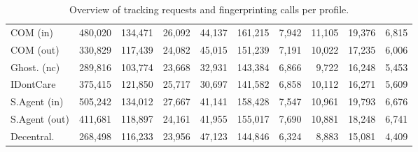 \begin{table}[H]
\begin{tabular}{lrrrrrrrrr}
    COM (in) & 480,020 & 134,471 & 26,092 & 44,137 & 161,215 & 7,942 & 11,105 & 19,376 & 6,815 \\
    COM (out) & 330,829 & 117,439 & 24,082 & 45,015 & 151,239 & 7,191 & 10,022 & 17,235 & 6,006 \\
    Ghost. (nc) & 289,816 & 103,774 & 23,668 & 32,931 & 143,384 & 6,866 & 9,722 & 16,248 & 5,453 \\
    IDontCare & 375,415 & 121,850 & 25,717 & 30,697 & 141,582 & 6,858 & 10,112 & 16,271 & 5,609 \\
    S.Agent (in) & 505,242 & 134,012 & 27,667 & 41,141 & 158,428 & 7,547 & 10,961 & 19,793 & 6,676 \\
    S.Agent (out) & 411,681 & 118,897 & 24,161 & 41,955 & 155,017 & 7,690 & 10,881 & 18,248 & 6,741 \\
    Decentral. & 268,498 & 116,233 & 23,956 & 47,123 & 144,846 & 6,324 & 8,883 & 15,081 & 4,409 \\
    \bottomrule
    \end{tabular}
    \caption{Overview of tracking requests and fingerprinting calls per profile.}
    \end{table}